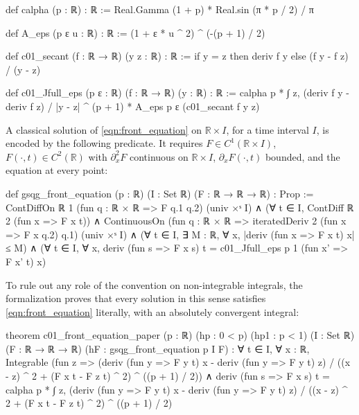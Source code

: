 \documentclass[11pt]{amsart}
\theoremstyle{definition}
\theoremstyle{remark}
\numberwithin{equation}{section}
\begin{document}
\par
\noindent\begin{minipage}{\linewidth}
\begin{leancode}
def calpha (p : ℝ) : ℝ := Real.Gamma (1 + p) * Real.sin (π * p / 2) / π

def A_eps (p ε u : ℝ) : ℝ := (1 + ε * u ^ 2) ^ (-(p + 1) / 2)

def c01_secant (f : ℝ → ℝ) (y z : ℝ) : ℝ :=
  if y = z then deriv f y else (f y - f z) / (y - z)

def c01_Jfull_eps (p ε : ℝ) (f : ℝ → ℝ) (y : ℝ) : ℝ :=
  calpha p * ∫ z, (deriv f y - deriv f z) / |y - z| ^ (p + 1) * A_eps p ε (c01_secant f y z)
\end{leancode}
\end{minipage}
\par

A classical solution of \eqref{eqn:front_equation} on $\mathbb R\times I$, for a time interval $I$, is encoded by the following predicate. It requires $F\in C^1(\mathbb R\times I)$, $F(\cdot,t)\in C^2(\mathbb R)$ with $\partial_x^2F$ continuous on $\mathbb R\times I$, $\partial_xF(\cdot,t)$ bounded, and the equation at every point:

\par
\noindent\begin{minipage}{\linewidth}
\begin{leancode}
def gsqg_front_equation (p : ℝ) (I : Set ℝ) (F : ℝ → ℝ → ℝ) : Prop :=
  ContDiffOn ℝ 1 (fun q : ℝ × ℝ => F q.1 q.2) (univ ×ˢ I) ∧
  (∀ t ∈ I, ContDiff ℝ 2 (fun x => F x t)) ∧
  ContinuousOn (fun q : ℝ × ℝ => iteratedDeriv 2 (fun x => F x q.2) q.1) (univ ×ˢ I) ∧
  (∀ t ∈ I, ∃ M : ℝ, ∀ x, |deriv (fun x => F x t) x| ≤ M) ∧
  (∀ t ∈ I, ∀ x, deriv (fun s => F x s) t = c01_Jfull_eps p 1 (fun x' => F x' t) x)
\end{leancode}
\end{minipage}
\par

To rule out any role of the convention on non-integrable integrals, the formalization proves that every solution in this sense satisfies \eqref{eqn:front_equation} literally, with an absolutely convergent integral:

\par
\noindent\begin{minipage}{\linewidth}
\begin{leancode}
theorem c01_front_equation_paper (p : ℝ) (hp : 0 < p) (hp1 : p < 1)
    (I : Set ℝ) (F : ℝ → ℝ → ℝ) (hF : gsqg_front_equation p I F) :
    ∀ t ∈ I, ∀ x : ℝ,
      Integrable (fun z => (deriv (fun y => F y t) x - deriv (fun y => F y t) z) /
        ((x - z) ^ 2 + (F x t - F z t) ^ 2) ^ ((p + 1) / 2)) ∧
      deriv (fun s => F x s) t = calpha p * ∫ z,
        (deriv (fun y => F y t) x - deriv (fun y => F y t) z) /
          ((x - z) ^ 2 + (F x t - F z t) ^ 2) ^ ((p + 1) / 2)
\end{leancode}
\end{minipage}
\par
\end{document}
